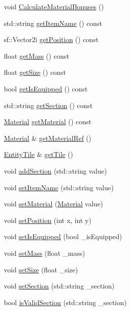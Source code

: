 \begin{DoxyCompactItemize}
\item 
void \mbox{\hyperlink{class_item_a8f02bc86b6f66142e35a660a5c28ba74}{Calculate\+Material\+Bonuses}} ()
\item 
std\+::string \mbox{\hyperlink{class_item_a806159273f1f9fbb07fe75a74f2f51c5}{get\+Item\+Name}} () const
\item 
sf\+::\+Vector2i \mbox{\hyperlink{class_item_ab015078a1ea19c197fc88b7a556d37cc}{get\+Position}} () const
\item 
float \mbox{\hyperlink{class_item_a452c0983b99f1b148949274b63ed79fd}{get\+Mass}} () const
\item 
float \mbox{\hyperlink{class_item_a2a84b0b0b25d4d1e8bb1b456d8094b84}{get\+Size}} () const
\item 
bool \mbox{\hyperlink{class_item_a9839c6a1b61487bbbe15b7ebba07de34}{get\+Is\+Equipped}} () const
\item 
std\+::string \mbox{\hyperlink{class_item_abe4ed40d2027ca131b669d471b47f29f}{get\+Section}} () const
\item 
\mbox{\hyperlink{class_material}{Material}} \mbox{\hyperlink{class_item_ada6692d4e0e9e8f9a9a78a13fd6522d8}{get\+Material}} () const
\item 
\mbox{\hyperlink{class_material}{Material}} \& \mbox{\hyperlink{class_item_af22ec5d207b70e2a3359e76dccfc7e11}{get\+Material\+Ref}} ()
\item 
\mbox{\hyperlink{class_entity_tile}{Entity\+Tile}} \& \mbox{\hyperlink{class_item_a61272a187be1a07a49685cbee45d30bd}{get\+Tile}} ()
\item 
void \mbox{\hyperlink{class_item_a6c9f73ef36b176cdb75bc9b13d5be8e8}{add\+Section}} (std\+::string value)
\item 
void \mbox{\hyperlink{class_item_ae8dd38d585a7795f134f6453feb1000e}{set\+Item\+Name}} (std\+::string value)
\item 
void \mbox{\hyperlink{class_item_af8f9e1899f933fc2ae2cdee6c7de0a4e}{set\+Material}} (\mbox{\hyperlink{class_material}{Material}} value)
\item 
void \mbox{\hyperlink{class_item_af8f03acf491fb71ec8cf1e4248bb4b3d}{set\+Position}} (int x, int y)
\item 
void \mbox{\hyperlink{class_item_ade0d63a4f02aa1a97f977b13f96eb891}{set\+Is\+Equipped}} (bool \+\_\+is\+Equipped)
\item 
void \mbox{\hyperlink{class_item_a3d6c15b2f0a37709541086df917aa761}{set\+Mass}} (float \+\_\+mass)
\item 
void \mbox{\hyperlink{class_item_a5ec923033eeb77f331c8307ef5141fc4}{set\+Size}} (float \+\_\+size)
\item 
void \mbox{\hyperlink{class_item_a87100c3d13e81e42e58969f817d591ef}{set\+Section}} (std\+::string \+\_\+section)
\item 
bool \mbox{\hyperlink{class_item_a10dd503844c230e3d3bf890e969af867}{is\+Valid\+Section}} (std\+::string \+\_\+section)
\end{DoxyCompactItemize}
